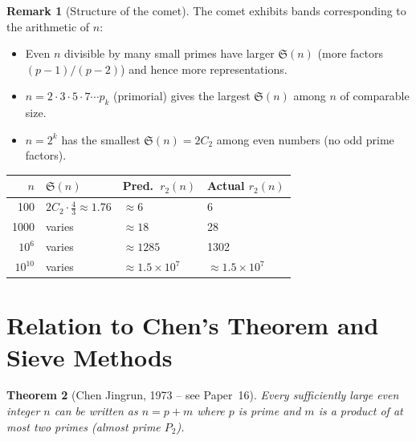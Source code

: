 \documentclass[12pt,a4paper]{amsart}
\newtheorem{theorem}{Theorem}[section]
\theoremstyle{definition}
\newtheorem{remark}[theorem]{Remark}
\begin{document}
\begin{remark}[Structure of the comet]
  The comet exhibits bands corresponding to the arithmetic of $n$:
  \begin{itemize}
    \item Even $n$ divisible by many small primes have larger $\mathfrak{S}(n)$
      (more factors $(p-1)/(p-2)$) and hence more representations.
    \item $n = 2 \cdot 3 \cdot 5 \cdot 7 \cdots p_k$ (primorial) gives the
      largest $\mathfrak{S}(n)$ among $n$ of comparable size.
    \item $n = 2^k$ has the smallest $\mathfrak{S}(n) = 2C_2$ among even
      numbers (no odd prime factors).
  \end{itemize}
\end{remark}

\begin{center}
\begin{tabular}{rlll}
\toprule
$n$ & $\mathfrak{S}(n)$ & Pred.\ $r_2(n)$ & Actual $r_2(n)$ \\
\midrule
100  & $2C_2 \cdot \tfrac{4}{3} \approx 1.76$ & $\approx 6$ & 6 \\
1000 & varies & $\approx 18$ & 28 \\
$10^6$ & varies & $\approx 1285$ & 1302 \\
$10^{10}$ & varies & $\approx 1.5\times 10^7$ & $\approx 1.5\times 10^7$ \\
\bottomrule
\end{tabular}
\end{center}

\section{Relation to Chen's Theorem and Sieve Methods}
\label{sec:chen}

\begin{theorem}[Chen Jingrun, 1973 -- see Paper~16]\label{thm:chen}
  Every sufficiently large even integer $n$ can be written as
  $n = p + m$ where $p$ is prime and $m$ is a product of at most two primes
  (\emph{almost prime} $P_2$).
\end{theorem}
\end{document}
